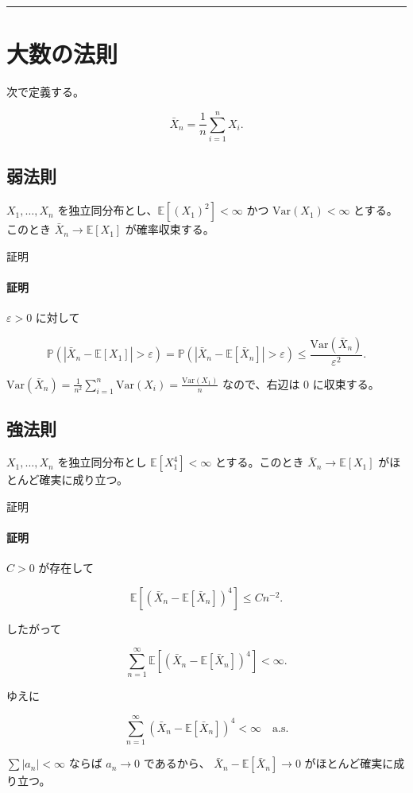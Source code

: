\documentclass[uplatex,dvipdfmx,11pt,a4paper,openany]{bxjsbook}
\begin{document}
\medskip\hrule\medskip
\section{大数の法則}
次で定義する。

\[\bar{X}_n = \frac{1}{n}\sum_{i=1}^n X_i.\]

\subsection{弱法則}
$X_1,\dots,X_n$ を独立同分布とし、$\mathbb E[(X_1)^2]<\infty$ かつ
                $\mathrm{Var}(X_1)<\infty$ とする。このとき $\bar{X}_n \to \mathbb E[X_1]$
                が確率収束する。

\begin{detailblock}{証明}
\paragraph{証明}
$\varepsilon>0$ に対して

\[\mathbb P(|\bar{X}_n-\mathbb E[X_1]|>\varepsilon)
                        = \mathbb P(|\bar{X}_n-\mathbb E[\bar{X}_n]|>\varepsilon)
                        \le \frac{\mathrm{Var}(\bar{X}_n)}{\varepsilon^2}.\]

$\mathrm{Var}(\bar{X}_n)=\frac{1}{n^2}\sum_{i=1}^n \mathrm{Var}(X_i)
                        = \frac{\mathrm{Var}(X_1)}{n}$ なので、右辺は $0$ に収束する。


\end{detailblock}

\subsection{強法則}
$X_1,\dots,X_n$ を独立同分布とし $\mathbb E[X_1^4] < \infty$ とする。このとき
                $\bar{X}_n \to \mathbb E[X_1]$ がほとんど確実に成り立つ。

\begin{detailblock}{証明}
\paragraph{証明}
$C>0$ が存在して

\[\mathbb E[(\bar{X}_n-\mathbb E[\bar{X}_n])^4] \le C n^{-2}.\]

したがって

\[\sum_{n=1}^{\infty}\mathbb E[(\bar{X}_n-\mathbb E[\bar{X}_n])^4] < \infty.\]

ゆえに

\[\sum_{n=1}^{\infty}(\bar{X}_n-\mathbb E[\bar{X}_n])^4 < \infty
                        \quad \text{a.s.}\]

$\sum |a_n|<\infty$ ならば $a_n\to 0$ であるから、
                        $\bar{X}_n-\mathbb E[\bar{X}_n] \to 0$ がほとんど確実に成り立つ。


\end{detailblock}
\end{document}
